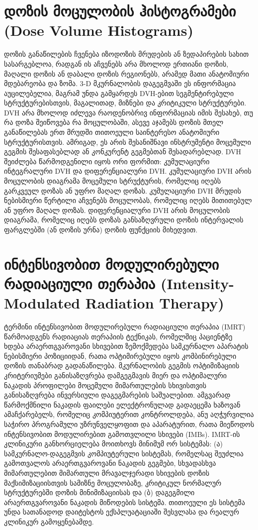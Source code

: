 \documentclass[12pt,a4paper,]{report}
\begin{document}
\section{დოზის მოცულობის ჰისტოგრამები (Dose Volume Histograms)}
დოზის განაწილების ჩვენება იზოდოზის მრუდების ან ზედაპირების სახით სასარგებლოა, რადგან ის აჩვენებს არა მხოლოდ ერთიანი დოზის, მაღალი დოზის ან დაბალი დოზის რეგიონებს, არამედ მათი ანატომიური მდებარეობა და ზომა. 3-D მკურნალობის დაგეგმვაში ეს ინფორმაცია აუცილებელია, მაგრამ უნდა გამყარდეს DVH-ებით სეგმენტირებული სტრუქტურებისთვის, მაგალითად, მიზნები და კრიტიკული სტრუქტურები. DVH არა მხოლოდ იძლევა რაოდენობრივ ინფორმაციას იმის შესახებ, თუ რა დოზა შეიწოვება რა მოცულობაში,  ასევე აჯამებს დოზის მთელ განაწილებას ერთ მრუდში თითოეული საინტერესო ანატომიური სტრუქტურისთვის.  ამრიგად, ეს არის შესანიშნავი ინსტრუმენტი მოცემული გეგმის შესაფასებლად ან კონკურენტ გეგმებთან შესადარებლად. DVH შეიძლება წარმოდგენილი იყოს ორი ფორმით: კუმულაციური ინტეგრალური DVH და დიფერენციალური DVH.  კუმულაციური DVH არის მოცულობის დიაგრამა მოცემული სტრუქტურის, რომელიც იღებს გარკვეულ დოზას ან უფრო მაღალ დოზას. კუმულაციური DVH მრუდის ნებისმიერი წერტილი აჩვენებს მოცულობას, რომელიც იღებს მითითებულ ან უფრო მაღალ დოზას. დიფერენციალური DVH არის მოცულობის დიაგრამა, რომელიც იღებს დოზას განსაზღვრული დოზის ინტერვალის ფარგლებში (ან დოზის ურნა) დოზის ფუნქციის მიხედვით.

\section{ინტენსივობით მოდულირებული რადიაციული თერაპია (Intensity-Modulated Radiation Therapy)}
ტერმინი ინტენსივობით მოდულირებული რადიაციული თერაპია (IMRT) წარმოადგენს რადიაციას თერაპიის ტექნიკას, რომელშიც პაციენტზე ხდება არაერთგვაროვანი სხივებით ზემოქმედება სამკურნალო აპარატის ნებისმიერი პოზიციიდან, რათა ოპტიმირებული იყოს კომბინირებული დოზის  თანაბრად გადანაწილება. მკურნალობის გეგმის ოპტიმიზაციის კრიტერიუმები განისაზღვრება დამგეგმავის მიერ და ოპტიმალური ნაკადის პროფილები მოცემული მიმართულების სხივისთვის განისაზღვრება ინვერსიული დაგეგმარების საშუალებით. ამგვარად წარმოქმნილი ნაკადის ფაილები ელექტრონულად გადაეცემა ხაზოვან ამაჩქარებელს, რომელიც კომპიუტერით კონტროლდება, ანუ აღჭურვილია საჭირო პროგრამული უზრუნველყოფით და აპარატურით, რათა მიეწოდოს  ინტენსივობით მოდულირებით გამოთვლილი სხივები (IMBs).  IMRT-ის კლინიკური განხორციელება მოითხოვს მინიმუმ ორ სისტემას: (ა) სამკურნალო-დაგეგმვის კომპიუტერული სისტემას, რომელსაც შეუძლია გამოთვალოს არაერთგვაროვანი ნაკადის  გეგმები, სხვადასხვა მიმართულებით მიმართული მრავალჯერადი სხივების დოზის მაქსიმიზაციისთვის სამიზნე მოცულობაზე, კრიტიკულ ნორმალურ სტრუქტურებში დოზის მინიმიზაციისას და (ბ)  დაგეგმილი არაერთგვაროვანი ნაკადის მიწოდების სისტემა. თითოეული ეს სისტემა უნდა სათანადოდ დაიტესტოს ექსპლუატაციაში შესვლასა და რეალურ კლინიკურ გამოყენებამდე.
\end{document}
